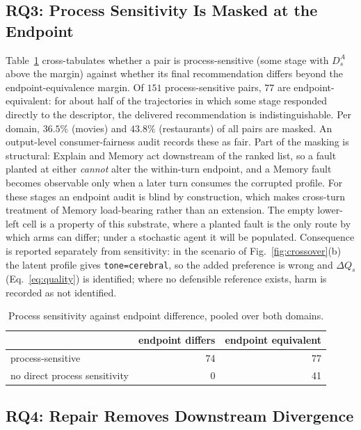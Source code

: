 \documentclass[runningheads]{llncs}
\begin{document}
\subsection{RQ3: Process Sensitivity Is Masked at the Endpoint}

Table~\ref{tab:controlled-masking} cross-tabulates whether a pair is process-sensitive (some stage
with $D_s^A$ above the margin) against whether its final recommendation differs beyond the
endpoint-equivalence margin. Of $151$ process-sensitive pairs, $77$ are endpoint-equivalent: for
about half of the trajectories in which some stage responded directly to the descriptor, the
delivered recommendation is indistinguishable. Per domain, $36.5\%$ (movies) and $43.8\%$
(restaurants) of all pairs are masked. An output-level consumer-fairness audit records these as
fair. Part of the masking is structural: Explain and Memory act downstream of the ranked list, so
a fault planted at either \emph{cannot} alter the within-turn endpoint, and a Memory fault becomes
observable only when a later turn consumes the corrupted profile. For these stages an endpoint
audit is blind by construction, which makes cross-turn treatment of Memory load-bearing rather
than an extension. The empty lower-left cell is a property of this substrate, where a planted
fault is the only route by which arms can differ; under a stochastic agent it will be populated.
Consequence is reported separately from sensitivity: in the scenario of
Fig.~\ref{fig:crossover}(b) the latent profile gives \texttt{tone=cerebral}, so the added preference
is wrong and $\Delta Q_s$ (Eq.~\eqref{eq:quality}) is identified; where no defensible reference
exists, harm is recorded as not identified.

\begin{table}[t]
\centering
\caption{Process sensitivity against endpoint difference, pooled over both domains.}
\label{tab:controlled-masking}
\scriptsize
\begin{tabular}{@{}lrr@{}}
\toprule
 & endpoint differs & endpoint equivalent \\
\midrule
process-sensitive             & 74 & 77 \\
no direct process sensitivity &  0 & 41 \\
\bottomrule
\end{tabular}
\end{table}

\subsection{RQ4: Repair Removes Downstream Divergence}
\end{document}
